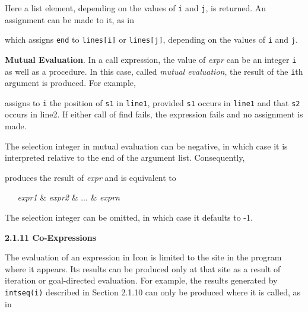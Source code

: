 Here a list element, depending on the values of \texttt{i} and
\texttt{j}, is returned. An assignment can be made to it, as in



\noindent which assigns \texttt{{\textquotedbl}end{\textquotedbl}} to
\texttt{lines[i]} or \texttt{lines[j]}, depending on the values of
\texttt{i} and \texttt{j}.


\textbf{Mutual Evaluation}. In a call expression, the value of
\textit{expr}\textit{} can be an integer
\texttt{i} as well as a procedure. In this case, called
\textit{mutual evaluation}, the result of the \texttt{i}th
argument is produced. For example,



\noindent assigns to \texttt{i} the position of \texttt{s1} in
\texttt{line1}, provided \texttt{s1} occurs in \texttt{line1} and that
\texttt{s2} occurs in line2. If either call of find fails, the
expression fails and no assignment is made.

The selection integer in mutual evaluation can be negative, in which
case it is interpreted relative to the end of the argument
list. Consequently,



\noindent
produces the result of \textit{expr} and is equivalent to


\textit{\ \ \ expr1 }\& \textit{expr2 }\& ... \& \textit{exprn}

The selection integer can be omitted, in which case it defaults to -1.


{\sffamily\bfseries
2.1.11 Co-Expressions}

The evaluation of an expression in Icon is limited to the site in the
program where it appears. Its results can be produced only at that
site as a result of iteration or goal-directed evaluation. For
example, the results generated by \texttt{intseq(i)} described in
Section 2.1.10 can only be produced where it is called, as in

